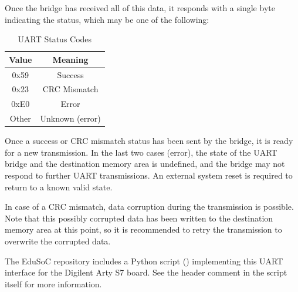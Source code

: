 Once the bridge has received all of this data, it responds with a single byte indicating the status, which may be one of the following:\\
\begin{table}[H]
    \centering
    \begin{tabular}{|c|c|}\hline
        Value & Meaning \\\hline\hline
        0x59 & Success \\
        0x23 & CRC Mismatch \\
        0xE0 & Error \\
        Other & Unknown (error) \\\hline
    \end{tabular}
    \caption{UART Status Codes}
    \label{tab:uart_status}
\end{table}
Once a success or CRC mismatch status has been sent by the bridge, it is ready for a new transmission.
In the last two cases (error), the state of the UART bridge and the destination memory area is undefined, and the bridge may not respond to further UART transmissions. An external system reset is required to return to a known valid state.

In case of a CRC mismatch, data corruption during the transmission is possible. Note that this possibly corrupted data has been written to the destination memory area at this point, so it is recommended to retry the transmission to overwrite the corrupted data.

The EduSoC repository includes a Python script () implementing this UART interface for the Digilent Arty S7 board. See the header comment in the script itself for more information.

\newpage
